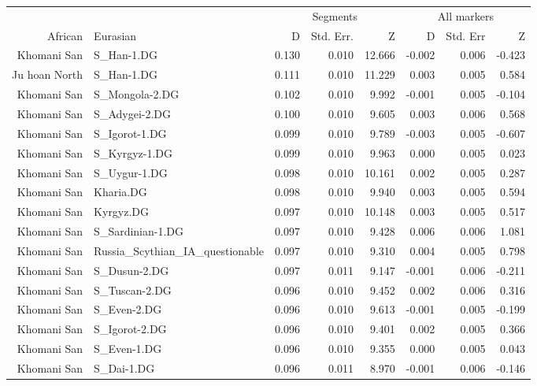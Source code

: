 \documentclass{article}
\begin{document}
\clearpage

\begin{table}[ht]
\centering
\begin{tabular}{rlrrrrrr}
  \hline
  & & \multicolumn{3}{c}{Segments} & \multicolumn{3}{c}{All markers} \\ \cline{3-8}
African & Eurasian & D & Std. Err. & Z & D & Std. Err & Z \\ 
  \hline
Khomani San & S\_Han-1.DG & 0.130 & 0.010 & 12.666 & -0.002 & 0.006 & -0.423 \\ 
  Ju hoan North & S\_Han-1.DG & 0.111 & 0.010 & 11.229 & 0.003 & 0.005 & 0.584 \\ 
  Khomani San & S\_Mongola-2.DG & 0.102 & 0.010 & 9.992 & -0.001 & 0.005 & -0.104 \\ 
  Khomani San & S\_Adygei-2.DG & 0.100 & 0.010 & 9.605 & 0.003 & 0.006 & 0.568 \\ 
  Khomani San & S\_Igorot-1.DG & 0.099 & 0.010 & 9.789 & -0.003 & 0.005 & -0.607 \\ 
  Khomani San & S\_Kyrgyz-1.DG & 0.099 & 0.010 & 9.963 & 0.000 & 0.005 & 0.023 \\ 
  Khomani San & S\_Uygur-1.DG & 0.098 & 0.010 & 10.161 & 0.002 & 0.005 & 0.287 \\ 
  Khomani San & Kharia.DG & 0.098 & 0.010 & 9.940 & 0.003 & 0.005 & 0.594 \\ 
  Khomani San & Kyrgyz.DG & 0.097 & 0.010 & 10.148 & 0.003 & 0.005 & 0.517 \\ 
  Khomani San & S\_Sardinian-1.DG & 0.097 & 0.010 & 9.428 & 0.006 & 0.006 & 1.081 \\ 
  Khomani San & Russia\_Scythian\_IA\_questionable & 0.097 & 0.010 & 9.310 & 0.004 & 0.005 & 0.798 \\ 
  Khomani San & S\_Dusun-2.DG & 0.097 & 0.011 & 9.147 & -0.001 & 0.006 & -0.211 \\ 
  Khomani San & S\_Tuscan-2.DG & 0.096 & 0.010 & 9.452 & 0.002 & 0.006 & 0.316 \\ 
  Khomani San & S\_Even-2.DG & 0.096 & 0.010 & 9.613 & -0.001 & 0.005 & -0.199 \\ 
  Khomani San & S\_Igorot-2.DG & 0.096 & 0.010 & 9.401 & 0.002 & 0.005 & 0.366 \\ 
  Khomani San & S\_Even-1.DG & 0.096 & 0.010 & 9.355 & 0.000 & 0.005 & 0.043 \\ 
  Khomani San & S\_Dai-1.DG & 0.096 & 0.011 & 8.970 & -0.001 & 0.006 & -0.146 \\ 

\end{tabular}
\end{table}
\end{document}
